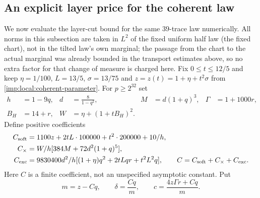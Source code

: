 \subsection{An explicit layer price for the coherent law}
\label{imp:local:finite-coherent-layer-section}

We now evaluate the layer-cut bound for the same $39$-trace law
numerically. All norms in this subsection are taken in $L^2$ of
the fixed uniform half law (the fixed chart), not in the tilted
law's own marginal; the passage from the chart to the actual
marginal was already bounded in the transport estimates above, so
no extra factor for that change of measure is charged here.
Fix $0\le t\le12/5$ and keep $\eta=1/100$, $L=13/5$,
$\sigma=13/75$ and $z=z(t)=1+\eta+t^2\sigma$ from
\cref{imp:local:coherent-parameter}.
For $p\ge2^{32}$ set
\begin{equation}\label{eq:merge-local-I-34}
 \begin{aligned}
 h&=1-9q,& d&=\frac8{1-q^2},&
 M&=d(1+q)^3,& \Gamma&=1+1000r,\\
 B_H&=14+r,& W&=\eta+(1+tB_H)^2 .
 \end{aligned}
\end{equation}
Define positive coefficients
\begin{equation}\label{eq:merge-local-I-35}
 \begin{aligned}
 C_{\rm soft}
   &=\frac{1100z+2tL\cdot100000+t^2\cdot200000+10}{h},\\
 C_\times&=\frac W h[384M+72d^2(1+q)^5],\\
 C_{\rm exc}
   &=\frac{9830400d^2}{h}
          [(1+\eta)q^2+2tLqr+t^2L^2q],\qquad
 C=C_{\rm soft}+C_\times+C_{\rm exc}.
 \end{aligned}
\end{equation}
Here $C$ is a finite coefficient, not an unspecified asymptotic
constant. Put
\begin{equation}\label{eq:merge-local-I-36}
 m=z-Cq,\qquad
 \delta=\frac{Cq}{m},\qquad
 c=\frac{4z\Gamma r+Cq}{m}.
\end{equation}


